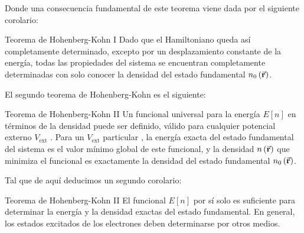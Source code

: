   Donde una consecuencia fundamental de este teorema viene dada por el siguiente corolario:

  \begin{mycoro}{Teorema de Hohenberg-Kohn I}{}
    Dado que el Hamiltoniano queda así completamente determinado, excepto por un desplazamiento constante de la energía, todas las propiedades del sistema se encuentran completamente determinadas con solo conocer la densidad del estado fundamental $n_0 \left( \va{r} \right)$.
\end{mycoro}

El segundo teorema de Hohenberg-Kohn es el siguiente:


\begin{mytheo}{Teorema de Hohenberg-Kohn II}{}
    Un funcional universal para la energía $E \left[ n \right]$ en términos de la densidad puede ser definido, válido para cualquier potencial externo $V_{\text{ext}}$ . Para un  $V_{\text{ext}}$ particular , la energía exacta del estado fundamental del sistema es el valor mínimo global de este funcional, y la densidad $n \left( \va{r} \right)$ que minimiza el funcional es exactamente la densidad del estado fundamental $n_0 \left( \va{r} \right)$.
\end{mytheo}

Tal que de aquí deducimos un segundo corolario:

\begin{mycoro}{Teorema de Hohenberg-Kohn II}{}
    El funcional $E \left[ n \right]$ por sí solo es suficiente para determinar la energía y la densidad exactas del estado fundamental. En general, los estados excitados de los electrones deben determinarse por otros medios.
\end{mycoro}